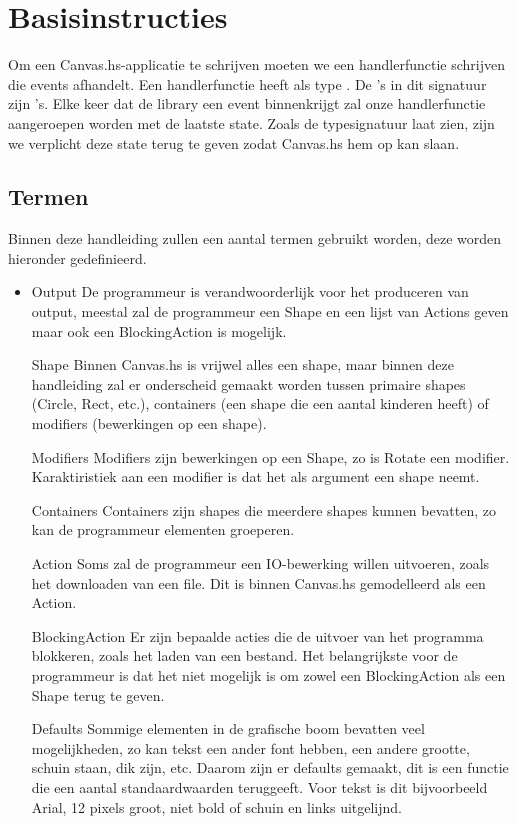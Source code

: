 \section{Basisinstructies}

Om een Canvas.hs-applicatie te schrijven moeten we een handlerfunctie schrijven die events afhandelt. Een handlerfunctie heeft als type . De 's in dit signatuur zijn 's. Elke keer dat de library een event binnenkrijgt zal onze handlerfunctie aangeroepen worden met de laatste state. Zoals de typesignatuur laat zien, zijn we verplicht deze state terug te geven zodat Canvas.hs hem op kan slaan.

\subsection{Termen}
Binnen deze handleiding zullen een aantal termen gebruikt worden, deze worden hieronder gedefinieerd.
\begin{itemize}
	\item Output
De programmeur is verandwoorderlijk voor het produceren van output, meestal zal de programmeur een Shape en een lijst van Actions geven maar ook een BlockingAction is mogelijk.
	\item[Shape]
Binnen Canvas.hs is vrijwel alles een shape, maar binnen deze handleiding zal er onderscheid gemaakt worden tussen primaire shapes (Circle, Rect, etc.), containers (een shape die een aantal kinderen heeft) of modifiers (bewerkingen op een shape).
	\item[Modifiers]
Modifiers zijn bewerkingen op een Shape, zo is Rotate een modifier. Karaktiristiek aan een modifier is dat het als argument een shape neemt.
	\item[Containers]
Containers zijn shapes die meerdere shapes kunnen bevatten, zo kan de programmeur elementen groeperen.
	\item[Action]
Soms zal de programmeur een IO-bewerking willen uitvoeren, zoals het downloaden van een file. Dit is binnen Canvas.hs gemodelleerd als een Action.
	\item[BlockingAction]
Er zijn bepaalde acties die de uitvoer van het programma blokkeren, zoals het laden van een bestand. Het belangrijkste voor de programmeur is dat het niet mogelijk is om zowel een BlockingAction als een Shape terug te geven. 
    \item[Defaults]
Sommige elementen in de grafische boom bevatten veel mogelijkheden, zo kan tekst een ander font hebben, een andere grootte, schuin staan, dik zijn, etc. Daarom zijn er defaults gemaakt, dit is een functie die een aantal standaardwaarden teruggeeft. Voor tekst is dit bijvoorbeeld Arial, 12 pixels groot, niet bold of schuin en links uitgelijnd.
\end{itemize}

